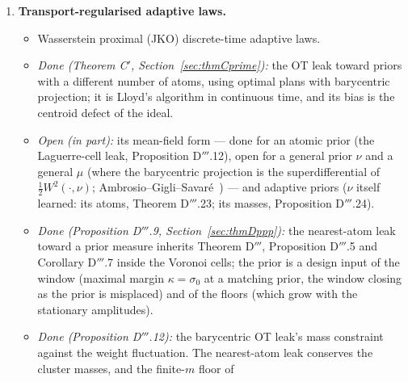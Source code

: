 \begin{enumerate}[label=\arabic*.,leftmargin=*]
\item \textbf{Transport-regularised adaptive laws.}
  \begin{itemize}
    \item Wasserstein proximal (JKO) discrete-time adaptive laws.
    \item \emph{Done (Theorem C$'$, Section~\ref{sec:thmCprime}):} the OT leak toward priors with a different number
      of atoms, using optimal plans with barycentric projection; it is Lloyd's algorithm in continuous time, and its
      bias is the centroid defect of the ideal.
    \item \emph{Open (in part):} its mean-field form --- done for an atomic prior (the Laguerre-cell leak,
      Proposition D$'''$.12), open for a general prior $\nu$ and a general $\mu$ (where the barycentric projection
      is the superdifferential of $\frac12W^2(\cdot,\nu)$; Ambrosio--Gigli--Savar\'e~\cite[Thm.~10.4.12]{ags2008})
      --- and adaptive priors ($\nu$ itself learned: its atoms, Theorem D$'''$.23; its masses,
      Proposition D$'''$.24).
    \item \emph{Done (Proposition D$'''$.9, Section~\ref{sec:thmDppp}):} the nearest-atom leak toward a prior
      measure inherits Theorem D$'''$, Proposition D$'''$.5 and Corollary D$'''$.7 inside the Voronoi cells; the
      prior is a design input of the window (maximal margin $\kappa = \sigma_0$ at a matching prior, the window
      closing as the prior is misplaced) and of the floors (which grow with the stationary amplitudes).
    \item \emph{Done (Proposition D$'''$.12):} the barycentric OT leak's mass constraint against the weight
      fluctuation. The nearest-atom leak conserves the cluster masses, and the finite-$m$ floor of

\end{itemize}
\end{enumerate}
